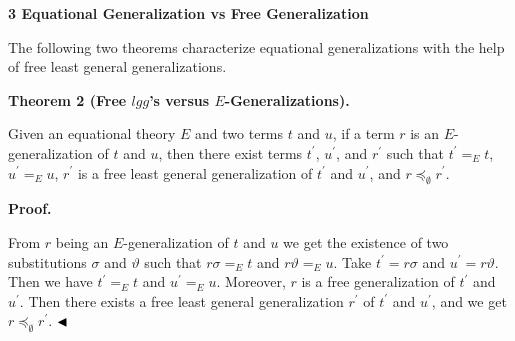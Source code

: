  
 


 
\par\medskip\noindent\textbf{3 Equational Generalization vs Free Generalization}\par
 
 
The following two theorems characterize equational generalizations with the help of free least general generalizations.\par
 
 
 
\par\medskip\noindent\textbf{Theorem 2 (Free $\mathit{lgg}$’s versus $E$-Generalizations).}\par
 
 
Given an equational theory $E$ and two terms $t$ and $u$, if a term $r$ is an $E$-generalization of $t$ and $u$, then there exist terms $t^{\prime}$, $u^{\prime}$, and $r^{\prime}$ such that $t^{\prime}=_{E}t$, $u^{\prime}=_{E}u$, $r^{\prime}$ is a free least general generalization of $t^{\prime}$ and $u^{\prime}$, and $r\preceq_{\emptyset}r^{\prime}$.\par
 
 
 
 
\par\medskip\noindent\textbf{Proof.}\par
 
 
From $r$ being an $E$-generalization of $t$ and $u$ we get the existence of two substitutions $\sigma$ and $\vartheta$ such that $r\sigma=_{E}t$ and $r\vartheta=_{E}u$. Take $t^{\prime}=r\sigma$ and $u^{\prime}=r\vartheta$. Then we have $t^{\prime}=_{E}t$ and $u^{\prime}=_{E}u$. Moreover, $r$ is a free generalization of $t^{\prime}$ and $u^{\prime}$. Then there exists a free least general generalization $r^{\prime}$ of $t^{\prime}$ and $u^{\prime}$, and we get $r\preceq_{\emptyset}r^{\prime}$. $\hfill\blacktriangleleft$\par
 
 
